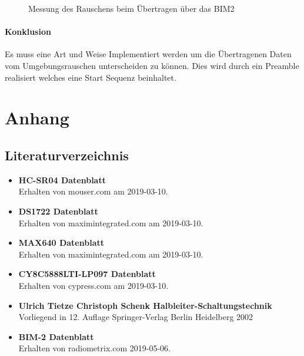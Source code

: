 \documentclass[12pt,a4paper,german]{article}
\begin{document}
\begin{figure}[H]
	
	\centering
	\label{fig:lorentzframe}

	\caption{Messung des Rauschens beim Übertragen über das BIM2}
\end{figure}

\paragraph{Konklusion}

Es muss eine Art und Weise Implementiert werden um die Übertragenen Daten vom
Umgebungsrauschen unterscheiden zu können. Dies wird durch ein Preamble
realisiert welches eine Start Sequenz beinhaltet.

\section{Anhang}

\subsection{Literaturverzeichnis}

\begin{itemize}
	
	\item{\textbf{HC-SR04 Datenblatt}}\\
		Erhalten von mouser.com am 2019-03-10.
	\item{\textbf{DS1722 Datenblatt}}\\
		Erhalten von maximintegrated.com am 2019-03-10.
	\item{\textbf{MAX640 Datenblatt}}\\
		Erhalten von maximintegrated.com am 2019-03-10.
	\item{\textbf{CY8C5888LTI-LP097 Datenblatt}}\\
		Erhalten von cypress.com am 2019-03-10.
	\item{\textbf{Ulrich Tietze Christoph Schenk 
		Halbleiter-Schaltungstechnik}}\\
		Vorliegend in 12. Auflage Springer-Verlag Berlin Heidelberg 2002
	\item{\textbf{BIM-2 Datenblatt}}\\
		Erhalten von radiometrix.com 2019-05-06.

\end{itemize}
\end{document}
